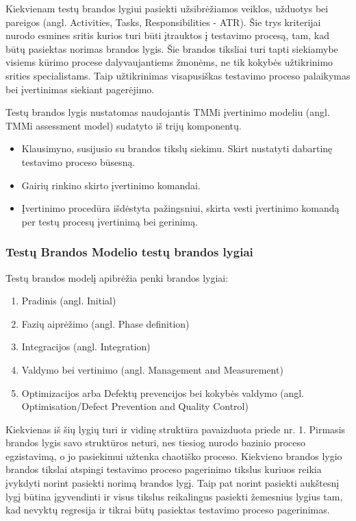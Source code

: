 \documentclass{VUMIFPSkursinis}
\begin{document}
Kiekvienam testų brandos lygiui pasiekti užsibrėžiamos veiklos, užduotys bei pareigos (angl. Activities, Tasks, Responsibilities - ATR). Šie trys kriterijai nurodo esmines sritis kurios turi būti įtrauktos į testavimo procesą, tam, kad būtų pasiektas norimas brandos lygis. Šie brandos tiksliai turi tapti siekiamybe visiems kūrimo procese dalyvaujantiems žmonėms, ne tik kokybės užtikrinimo srities specialistams. Taip užtikrinimas visapusiškas testavimo proceso palaikymas bei įvertinimas siekiant pagerėjimo.

Testų brandos lygis nustatomas naudojantis TMMi įvertinimo modeliu (angl. TMMi assessment model) sudatyto iš trijų komponentų.
\begin{itemize}
   \item Klausimyno, susijusio su brandos tikslų siekimu. Skirt nustatyti dabartinę testavimo proceso būsesną.
   \item Gairių rinkino skirto įvertinimo komandai.
   \item Įvertinimo procedūra išdėstyta pažingsniui, skirta vesti įvertinimo komandą per testų procesų įvertinimą bei gerinimą.
\end{itemize}

\subsubsection{Testų Brandos Modelio testų brandos lygiai}
Testų brandos modelį apibrėžia penki brandos lygiai\cite{Burnstein:2010:PST:1965566}:
\begin{enumerate}
   \item Pradinis (angl. Initial)
   \item Fazių aiprėžimo (angl. Phase definition)
   \item Integracijos (angl. Integration)
   \item Valdymo bei vertinimo (angl. Management and Measurement)
   \item Optimizacijos arba Defektų prevencijos bei kokybės valdymo (angl. Optimisation/Defect Prevention and Quality Control)
\end{enumerate}
Kiekvienas iš šių lygių turi ir vidinę struktūra pavaizduota priede nr. 1. Pirmasis brandos lygis savo struktūros neturi, nes tiesiog nurodo bazinio proceso egzistavimą, o jo pasiekimui užtenka chaotiško proceso. Kiekvieno brandos lygio brandos tikslai atspingi testavimo proceso pagerinimo tikslus kuriuos reikia įvykdyti norint pasiekti norimą brandos lygį. Taip pat norint pasiekti aukštesnį lygį būtina įgyvendinti ir visus tikslus reikalingus pasiekti žemesnius lygius tam, kad nevyktų regresija ir tikrai būtų pasiektas testavimo proceso pagerinimas.
\end{document}
